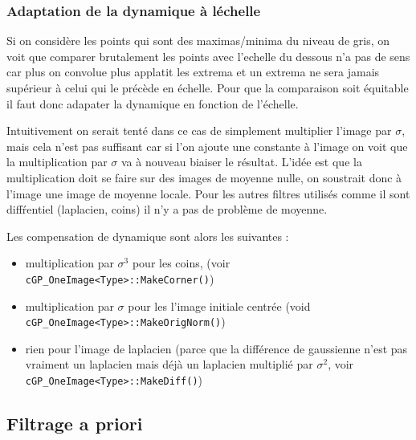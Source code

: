
\subsubsection{Adaptation de la dynamique \`a l\'echelle}

Si on consid\`ere les points qui sont des maximas/minima du niveau de gris,
on voit que comparer brutalement les points avec l'echelle du dessous n'a pas
de sens car plus on convolue plus applatit les extrema et un extrema ne sera
jamais sup\'erieur \`a celui qui le pr\'ec\`ede en \'echelle. Pour que la comparaison
soit \'equitable il faut donc adapater la dynamique en fonction de l'\'echelle.

Intuitivement on serait tent\'e dans ce cas de simplement multiplier l'image 
par  $\sigma$, mais cela n'est pas suffisant car si l'on ajoute une constante \`a l'image
on voit que la multiplication par $\sigma$ va \`a nouveau biaiser le r\'esultat. L'id\'ee
est que la multiplication doit se faire sur des images de moyenne nulle, on soustrait donc \`a
l'image une image de moyenne locale.  Pour les autres filtres utilis\'es comme il sont
diff\'rentiel (laplacien, coins) il n'y a pas de probl\`eme de moyenne.


Les compensation de dynamique sont alors les suivantes :

\begin{itemize}
   \item multiplication par $\sigma^3$ pour les coins, (voir {\tt cGP\_OneImage<Type>::MakeCorner()})

   \item multiplication par $\sigma$ pour les l'image initiale centr\'ee (void {\tt cGP\_OneImage<Type>::MakeOrigNorm()})

   \item rien pour l'image de laplacien (parce que la diff\'erence de gaussienne n'est pas vraiment un laplacien
         mais d\'ej\`a un laplacien multipli\'e par $\sigma^2$, voir {\tt cGP\_OneImage<Type>::MakeDiff()})

\end{itemize}
 

\subsection{Filtrage a priori}


